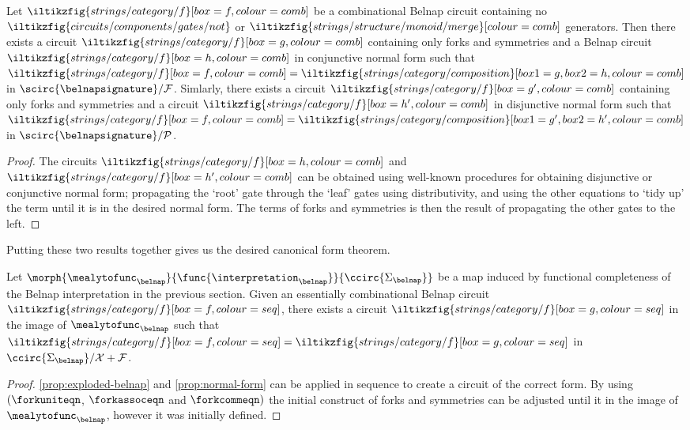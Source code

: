 \begin{proposition}\label{prop:normal-form}
    Let \(
    \iltikzfig{strings/category/f}[box=f,colour=comb]
    \) be a combinational Belnap circuit containing no \(
    \iltikzfig{circuits/components/gates/not}
    \) or \(
    \iltikzfig{strings/structure/monoid/merge}[colour=comb]
    \) generators.
    Then there exists a circuit \(
    \iltikzfig{strings/category/f}[box=g,colour=comb]
    \) containing only forks and symmetries and a Belnap circuit \(
    \iltikzfig{strings/category/f}[box=h,colour=comb]
    \) in conjunctive normal form such that \(
    \iltikzfig{strings/category/f}[box=f,colour=comb]
    =
    \iltikzfig{strings/category/composition}[box1=g,box2=h,colour=comb]
    \) in \(
    \scirc{\belnapsignature} / \mathcal{F}
    \).
    Simlarly, there exists a circuit \(
    \iltikzfig{strings/category/f}[box=g^\prime,colour=comb]
    \) containing only forks and symmetries and a circuit \(
    \iltikzfig{strings/category/f}[box=h^\prime,colour=comb]
    \) in disjunctive normal form such that \(
    \iltikzfig{strings/category/f}[box=f,colour=comb]
    =
    \iltikzfig{strings/category/composition}[box1=g^\prime,box2=h^\prime,colour=comb]
    \) in \(
    \scirc{\belnapsignature} / \mathcal{P}
    \).
\end{proposition}
\begin{proof}
    The circuits \(
    \iltikzfig{strings/category/f}[box=h,colour=comb]
    \) and \(
    \iltikzfig{strings/category/f}[box=h^\prime,colour=comb]
    \) can be obtained using well-known procedures for obtaining disjunctive or
    conjunctive normal form; propagating the `root' gate through the `leaf'
    gates using distributivity, and using the other equations to `tidy up' the
    term until it is in the desired normal form.
    The terms of forks and symmetries is then the result of propagating the
    other gates to the left.
\end{proof}

Putting these two results together gives us the desired canonical form theorem.

\begin{theorem}
    Let \(
    \morph{\mealytofunc_\belnap}{\func{\interpretation_{\belnap}}}{\ccirc{\Sigma_\belnap}}
    \) be a map induced by functional completeness of the Belnap interpretation
    in the previous section.
    Given an essentially combinational Belnap circuit \(
    \iltikzfig{strings/category/f}[box=f,colour=seq]
    \), there exists a circuit \(
    \iltikzfig{strings/category/f}[box=g,colour=seq]
    \) in the image of \(\mealytofunc_\belnap\) such that \(
    \iltikzfig{strings/category/f}[box=f,colour=seq]
    =
    \iltikzfig{strings/category/f}[box=g,colour=seq]
    \) in \(\ccirc{\Sigma_\belnap} / \mathcal{X} + \mathcal{F}\).
\end{theorem}
\begin{proof}
    \cref{prop:exploded-belnap} and \cref{prop:normal-form} can be applied in
    sequence to create a circuit of the correct form.
    By using \((\forkuniteqn\), \(\forkassoceqn\) and \(\forkcommeqn)\) the
    initial construct of forks and symmetries can be adjusted until it in the
    image of \(\mealytofunc_\belnap\), however it was initially defined.
\end{proof}
